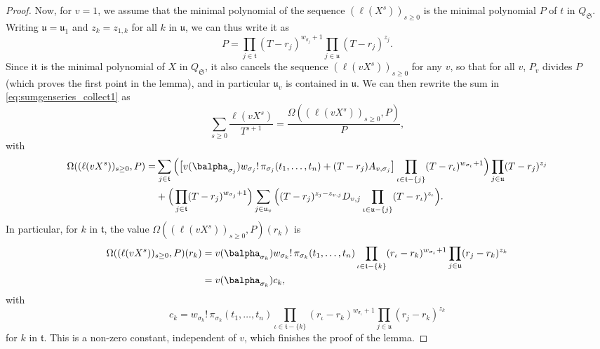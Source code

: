 \documentclass[12pt]{article}
\newcommand{\minpoly}{P}
\newcommand{\lf}{X}
\begin{document}
\begin{proof}
  Now, for $v=1$, we assume that the minimal polynomial of the sequence
  $(\ell(\lf^s))_{s \ge 0}$ is the minimal polynomial $\minpoly$ of $t$ in
  $Q_\mathfrak{S}$.  Writing $\mathfrak{u}=\mathfrak{u}_1$ and
  $z_k=z_{1,k}$ for all $k$ in $\mathfrak{u}$, we can thus write it as
  $$\minpoly=\prod_{j \in \mathfrak{t}} (T-r_{j})^{w_{\sigma_{j}}+1}
  \prod_{j \in \mathfrak{u}} (T-r_{j})^{z_{j}}.$$ Since it is the
  minimal polynomial of $\lf$ in $Q_\mathfrak{S}$, it also cancels the
  sequence $(\ell(v \lf^s))_{s \ge 0}$ for any $v$, so that for all
  $v$, $\minpoly_v$ divides $\minpoly$ (which proves the first point
  in the lemma), and in particular $\mathfrak{u}_v$ is contained in
  $\mathfrak{u}$.
  We can then rewrite the
  sum in \cref{eq:sumgenseries_collect1} as $$ \sum_{s \ge 0} \frac{\ell(v \lf^s)}{T^{s+1}} =\frac{\Omega((\ell(v \lf^s))_{s \ge 0} ,\minpoly)}{\minpoly},$$ with
  \begin{align*}
    \Omega((\ell(v \lf^s))_{s \ge 0} ,\minpoly)=&\sum_{j \in \mathfrak{t}} \Big(\big[
      v(\balpha_{\sigma_{j}})  w_{\sigma_j}!\, \pi_{\sigma_j}(t_1,\dots,t_n)
      + (T-r_j) A_{v,\sigma_j}\big]
    \prod_{\iota \in \mathfrak{t}-\{j\}}(T-r_{\iota} )^{w_{\sigma_{\iota}}+1}
    \Big)\prod_{j \in \mathfrak{u}}(T-r_j )^{z_j}
    \\
    &+
    \Big(\prod_{j \in \mathfrak{t}}(T-r_{j} )^{w_{\sigma_j}+1}\Big)
    \sum_{j \in \mathfrak{u}_v} \Big (
    (T-r_j)^{z_{j}-z_{v,j}} D_{v,j}
    \prod_{\iota \in \mathfrak{u}-\{j\}}(T-r_{\iota} )^{z_{\iota}}\Big).
  \end{align*}
  In particular, 
  for $k$ in $\mathfrak{t}$,
  the value $\Omega((\ell(v \lf^s))_{s \ge 0} ,\minpoly)(r_k)$ is 
  \begin{align*}
    \Omega((\ell(v \lf^s))_{s \ge 0} ,\minpoly)(r_k)&= v(\balpha_{\sigma_{k}}) w_{\sigma_k}!\, \pi_{\sigma_k}(t_1,\dots,t_n)
    \prod_{\iota \in \mathfrak{t}-\{k\}}(r_\iota-r_{k} )^{w_{\sigma_{\iota}}+1}
    \prod_{j \in \mathfrak{u}}(r_j-r_{k} )^{z_{k}}\\
    &= v(\balpha_{\sigma_{k}}) c_{k},
  \end{align*}
  with 
  $$c_{k}=
  w_{\sigma_k}!\, \pi_{\sigma_k}(t_1,\dots,t_n)
  \prod_{\iota \in \mathfrak{t}-\{k\}}(r_\iota-r_{k} )^{w_{\sigma_{\iota}}+1}
  \prod_{j \in \mathfrak{u}}(r_j-r_{k} )^{z_{k}}$$
  for $k$ in $\mathfrak{t}$. This is a non-zero constant, independent 
  of $v$, which finishes the proof of the lemma.
\end{proof}

\end{document}
